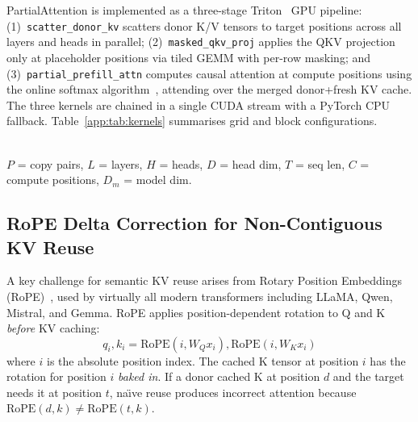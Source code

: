 \documentclass[10pt,twocolumn]{article}
\begin{document}
PartialAttention is implemented as a three-stage Triton~\cite{triton}
GPU pipeline: (1)~\texttt{scatter\_donor\_kv} scatters donor K/V
tensors to target positions across all layers and heads in parallel;
(2)~\texttt{masked\_qkv\_proj} applies the QKV projection only at
placeholder positions via tiled GEMM with per-row masking; and
(3)~\texttt{partial\_prefill\_attn} computes causal attention at
compute positions using the online softmax algorithm~\cite{flashattention},
attending over the merged donor+fresh KV cache. The three kernels are chained in a single CUDA stream with a PyTorch
CPU fallback. Table~\ref{app:tab:kernels} summarises grid and block
configurations.

\begin{table}[ht]
\centering
\caption{Triton kernel configurations for PartialAttention.}
\label{app:tab:kernels}
\footnotesize
{}\\[2pt]
{\footnotesize $P$ = copy pairs, $L$ = layers, $H$ = heads,
$D$ = head dim, $T$ = seq len, $C$ = compute positions,
$D_m$ = model dim.}
\end{table}

\subsection{RoPE Delta Correction for Non-Contiguous KV Reuse}
\label{sec:rope-correction}

A key challenge for semantic KV reuse arises from Rotary Position
Embeddings (RoPE)~\cite{rope}, used by virtually all modern transformers
including LLaMA, Qwen, Mistral, and Gemma. RoPE applies position-dependent
rotation to Q and K \emph{before} KV caching:
\begin{equation}
  q_i, k_i = \text{RoPE}(i, W_Q x_i), \text{RoPE}(i, W_K x_i)
  \label{eq:rope}
\end{equation}
where $i$ is the absolute position index. The cached K tensor at position
$i$ has the rotation for position $i$ \emph{baked in}. If a donor cached
K at position $d$ and the target needs it at position $t$, na\"{\i}ve
reuse produces incorrect attention because
$\text{RoPE}(d, k) \neq \text{RoPE}(t, k)$.
\end{document}
